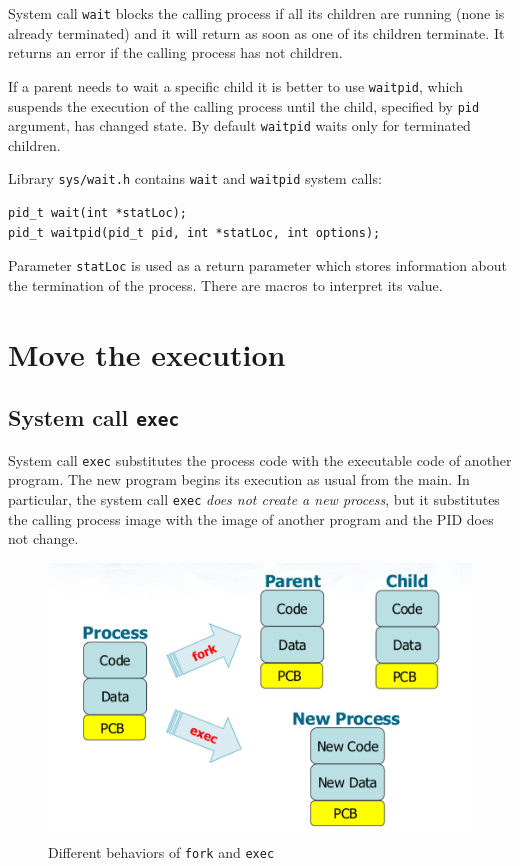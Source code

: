 System call \texttt{wait} blocks the calling process if all its children are running (none is already terminated) and it will return as soon as one of its children terminate. It returns an error if the calling process has not children.

If a parent needs to wait a specific child it is better to use \texttt{waitpid}, which suspends the execution of the calling process until the child, specified by \texttt{pid} argument, has changed state. By default \texttt{waitpid} waits only for terminated children.

Library \texttt{sys/wait.h} contains \texttt{wait} and \texttt{waitpid} system calls:
\begin{verbatim}
pid_t wait(int *statLoc);
pid_t waitpid(pid_t pid, int *statLoc, int options);
\end{verbatim}

Parameter \texttt{statLoc} is used as a return parameter which stores information about the termination of the process. There are macros to interpret its value.

\section{Move the execution}
\subsection{System call \texttt{exec}}
System call \texttt{exec} substitutes the process code with the executable code of another program. The new program begins its execution as usual from the main. In particular, the system call \texttt{exec} \textit{does not create a new process}, but it substitutes the calling process image with the image of another program and the PID does not change.

\begin{figure}[hbtp]
\centering
\includegraphics[scale=0.4]{images/processes_concurrency/fork_exec.png}
\caption{Different behaviors of \texttt{fork} and \texttt{exec}}
\end{figure}

